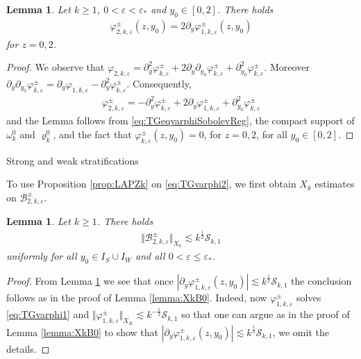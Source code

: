\documentclass[11pt,reqno]{amsproc}
\makeatletter
\renewcommand\subsubsection{\@startsection{subsubsection}{3}%
\normalparindent{.5\linespacing\@plus.7\linespacing}{-.5em}
{\normalfont\bfseries}}
\newtheorem{lemma}[proposition]{Lemma}
\theoremstyle{definition}
\numberwithin{equation}{section}
\newcommand{\B}{{\mathcal{B}}}
\newcommand{\cS}{{\mathcal S}}
\newcommand{\ep}{\varepsilon}
\makeatother
\begin{document}
\begin{lemma}\label{lemma:tracevarphi2}
Let $k\geq 1$, $0<\ep<\ep_*$ and $y_0\in [0,2]$. There holds
\begin{align*}
\varphi_{2,k,\ep}^\pm(z,y_0) = 2\partial_y\varphi_{1,k,\ep}^\pm(z,y_0)
\end{align*}
for $z=0,2$.
\end{lemma}

\begin{proof}
We observe that $\varphi_{2,k,\ep} = \partial_y^2\varphi_{k,\ep}^\pm + 2\partial_y\partial_{y_0}\varphi_{k,\ep}^\pm + \partial_{y_0}^2\varphi_{k,\ep}^\pm$. Moreover $\partial_y\partial_{y_0}\varphi_{k,\ep}^\pm = \partial_y\varphi_{1,k,\ep} -\partial_y^2\varphi_{k,\ep}^\pm$. Consequently,
\begin{align*}
\varphi_{2,k,\ep}^\pm = -\partial_y^2\varphi_{k,\ep}^\pm + 2\partial_y\varphi_{1,k,\ep}^\pm + \partial_{y_0}^2\varphi_{k,\ep}^\pm
\end{align*}
and the Lemma follows from \eqref{eq:TGeqvarphiSobolevReg}, the compact support of $\omega_k^0$ and $\varrho_k^0$, and the fact that $\varphi_{k,\ep}^\pm(z,y_0)=0$, for $z=0,2$, for all $y_0\in [0,2]$.
\end{proof}

\subsubsection{Strong and weak stratifications}

To use Proposition \ref{prop:LAPZk} on \eqref{eq:TGvarphi2}, we first obtain $X_k$ estimates on $\B_{2,k,\ep}^\pm$.

\begin{lemma}\label{lemma:XkB2}
Let $k\geq 1$. There holds
\begin{align*}
\Vert \B_{2,k,\ep}^\pm \Vert_{X_k}\lesssim k^\frac12\cS_{k,1}
\end{align*}
uniformly for all $y_0\in I_S\cup I_{W}$ and all $0 < \ep\leq \ep_*$.
\end{lemma}

\begin{proof}
From Lemma \ref{lemma:tracevarphi2} we see that once $\left|\partial_y\varphi_{1,k,\ep}^\pm(z,y_0) \right|\lesssim k^\frac12\cS_{k,1}$ the conclusion follows as in the proof of Lemma \ref{lemma:XkB0}. Indeed, now $\varphi_{1,k,\ep}^\pm$ solves \eqref{eq:TGvarphi1} and $\Vert \varphi_{1,k,\ep}^\pm \Vert_{X_K}\lesssim k^{-\frac12}\cS_{k,1}$ so that one can argue as in the proof of Lemma \ref{lemma:XkB0} to show that $\left|\partial_y\varphi_{1,k,\ep}^\pm(z,y_0) \right|\lesssim k^\frac12\cS_{k,1}$, we omit the details.
\end{proof}
\end{document}
